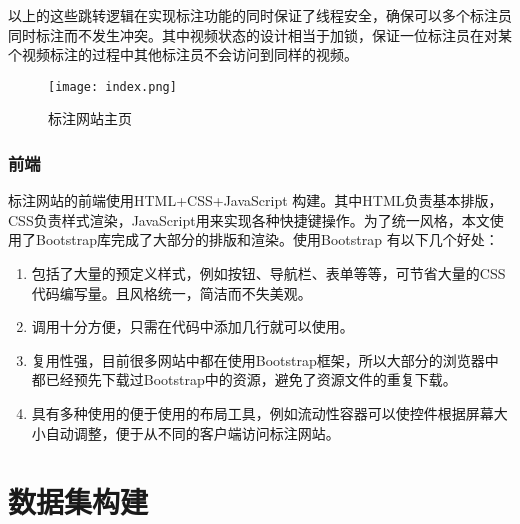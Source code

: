 以上的这些跳转逻辑在实现标注功能的同时保证了线程安全，确保可以多个标注员同时标注而不发生冲突。其中视频状态的设计相当于加锁，保证一位标注员在对某个视频标注的过程中其他标注员不会访问到同样的视频。

\begin{figure}[htbp]
    \centering
    \texttt{[image: index.png]}
    \caption{标注网站主页}
    \label{fig:anno_index}
\end{figure}
\subsubsection{前端}
标注网站的前端使用HTML+CSS+JavaScript 构建。其中HTML负责基本排版，CSS负责样式渲染，JavaScript用来实现各种快捷键操作。为了统一风格，本文使用了Bootstrap\cite{bootstrap}库完成了大部分的排版和渲染。使用Bootstrap 有以下几个好处：
\begin{enumerate}
    \item 包括了大量的预定义样式，例如按钮、导航栏、表单等等，可节省大量的CSS代码编写量。且风格统一，简洁而不失美观。
    \item 调用十分方便，只需在代码中添加几行就可以使用。
    \item 复用性强，目前很多网站中都在使用Bootstrap框架，所以大部分的浏览器中都已经预先下载过Bootstrap中的资源，避免了资源文件的重复下载。
    \item 具有多种使用的便于使用的布局工具，例如流动性容器可以使控件根据屏幕大小自动调整，便于从不同的客户端访问标注网站。
\end{enumerate}

\section{数据集构建}
